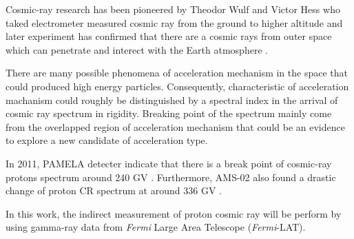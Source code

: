 \par Cosmic-ray research has been pioneered by Theodor Wulf and Victor Hess who taked electrometer measured cosmic ray from the ground to higher altitude and later experiment has confirmed that there are a cosmic rays from outer space which can penetrate and interect with the Earth atmosphere \cite{HESS,Pacini,Clay}.

\par There are many possible phenomena of acceleration mechanism in the
space that could produced high energy particles. Consequently, characteristic of acceleration machanism could roughly be distinguished by a spectral index in the arrival of cosmic ray spectrum in rigidity.
Breaking point of the spectrum mainly come from the overlapped region of acceleration mechanism that could be an evidence to explore a new candidate of acceleration type.

In 2011, PAMELA detecter indicate that there is a break point of cosmic-ray protons spectrum around 240 GV \cite{PAMELA}.
Furthermore, AMS-02 also found a drastic change of proton CR spectrum at around 336 GV \cite{AMS-02}.

\par In this work, the indirect measurement of proton cosmic ray will be perform by using gamma-ray data from \textit{Fermi} Large Area Telescope (\textit{Fermi}-LAT).